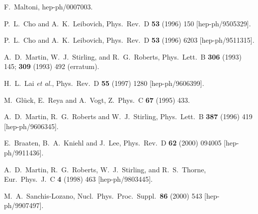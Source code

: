 \begin{thebibliography}{999}
F.~Maltoni,
hep-ph/0007003.

P.~L.~Cho and A.~K.~Leibovich,
Phys.\ Rev.\ D {\bf 53} (1996) 150
[hep-ph/9505329].

P.~L.~Cho and A.~K.~Leibovich,
Phys.\ Rev.\ D {\bf 53} (1996) 6203
[hep-ph/9511315].

A.~D.~Martin, W.~J.~Stirling, and R.~G.~Roberts,
Phys.\ Lett.\ B {\bf 306} (1993) 145;
{\bf 309} (1993) 492 (erratum).

H.~L.~Lai {\it et al.},
Phys.\ Rev.\ D {\bf 55} (1997) 1280
[hep-ph/9606399].

M.~Gl\"uck, E.~Reya and A.~Vogt,
Z.\ Phys.\ C {\bf 67} (1995) 433.

A.~D.~Martin, R.~G.~Roberts and W.~J.~Stirling,
Phys.\ Lett.\ B {\bf 387} (1996) 419
[hep-ph/9606345].

E.~Braaten, B.~A.~Kniehl and J.~Lee,
Phys.\ Rev.\ D {\bf 62} (2000) 094005
[hep-ph/9911436].

A.~D.~Martin, R.~G.~Roberts, W.~J.~Stirling, and R.~S.~Thorne,
Eur.\ Phys.\ J.\ C {\bf 4} (1998) 463
[hep-ph/9803445].

M.~A.~Sanchis-Lozano,
Nucl.\ Phys.\ Proc.\ Suppl.\  {\bf 86} (2000) 543
[hep-ph/9907497].


\end{thebibliography}
